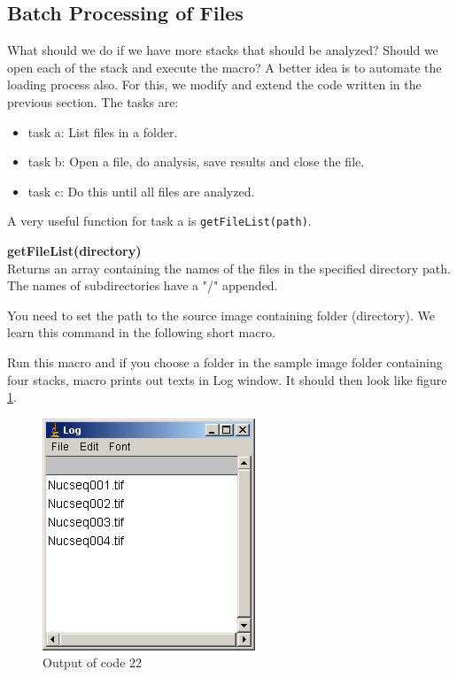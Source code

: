 \documentclass[11pt,a4paper,oneside]{report}
\newenvironment{indentCom}%
{\begin{list}{}%
         {\setlength{\leftmargin}{1em}}%
         \item[]%
}
{\end{list}}
\newcommand{\ilcom}[1]{\texttt{\small#1}}
\begin{document}
\subsection{Batch Processing of Files}

What should we do if we have more stacks that should be analyzed? Should we open each of the stack and execute the macro? A better idea is to automate the loading process also. For this, we modify and extend the code written in the previous section. The tasks are:

\begin{itemize}
\item task a: List files in a folder.
\item task b: Open a file, do analysis, save results and close the file. 
\item task c: Do this until all files are analyzed.
\end{itemize}
 
A very useful function for task a is \ilcom{getFileList(path)}.
\begin{indentCom}
\textbf{getFileList(directory)}\\
Returns an array containing the names of the files in the specified directory path. The names of subdirectories have a "/" appended.
\end{indentCom}
 
You need to set the path to the source image containing folder (directory). We learn this command in the following short macro. 



Run this macro and if you choose a folder in the sample image folder containing four stacks,  macro prints out texts in Log window. It should then look like figure \ref{fig:code22out}.
\begin{figure}[htbp]
\begin{center}
\includegraphics[scale=0.6]{fig/fig2521_FileBatchOUtput.png}
\caption{Output of code 22}
\label{fig:code22out}
\end{center}
\end{figure}
\end{document}
